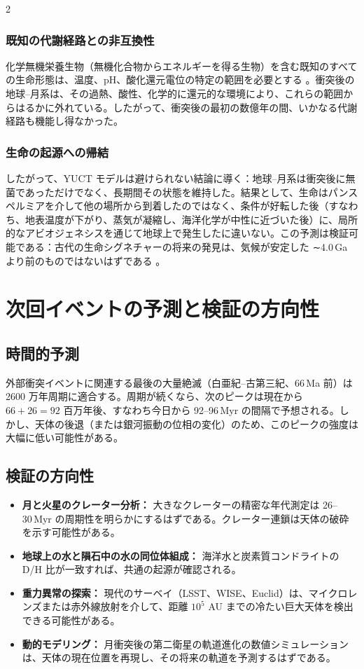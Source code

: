 \documentclass[12pt,a4paper]{article}
\begin{document}
\begin{multicols}{2}
		\subsubsection{既知の代謝経路との非互換性}
		化学無機栄養生物（無機化合物からエネルギーを得る生物）を含む既知のすべての生命形態は、温度、pH、酸化還元電位の特定の範囲を必要とする \cite{Chemolithoautotroph}。衝突後の地球–月系は、その過熱、酸性、化学的に還元的な環境により、これらの範囲からはるかに外れている。したがって、衝突後の最初の数億年の間、いかなる代謝経路も機能し得なかった。
		
		\subsubsection{生命の起源への帰結}
		したがって、YUCT モデルは避けられない結論に導く：地球–月系は衝突後に無菌であっただけでなく、長期間その状態を維持した。結果として、生命はパンスペルミアを介して他の場所から到着したのではなく、条件が好転した後（すなわち、地表温度が下がり、蒸気が凝縮し、海洋化学が中性に近づいた後）に、局所的なアビオジェネシスを通じて地球上で発生したに違いない。この予測は検証可能である：古代の生命シグネチャーの将来の発見は、気候が安定した ∼4.0 Ga より前のものではないはずである \cite{AbiogenesisReview}。
		
		\section{次回イベントの予測と検証の方向性}
		\subsection{時間的予測}
		外部衝突イベントに関連する最後の大量絶滅（白亜紀–古第三紀、66 Ma 前）は 2600 万年周期に適合する。周期が続くなら、次のピークは現在から \(66 + 26 = 92\) 百万年後、すなわち今日から 92–96 Myr の間隔で予想される。しかし、天体の後退（または銀河振動の位相の変化）のため、このピークの強度は大幅に低い可能性がある。
		
		\subsection{検証の方向性}
		\begin{itemize}
			\item \textbf{月と火星のクレーター分析：} 大きなクレーターの精密な年代測定は 26–30 Myr の周期性を明らかにするはずである。クレーター連鎖は天体の破砕を示す可能性がある。
			\item \textbf{地球上の水と隕石中の水の同位体組成：} 海洋水と炭素質コンドライトの D/H 比が一致すれば、共通の起源が確認される。
			\item \textbf{重力異常の探索：} 現代のサーベイ（LSST、WISE、Euclid）は、マイクロレンズまたは赤外線放射を介して、距離 \(10^5\) AU までの冷たい巨大天体を検出できる可能性がある。
			\item \textbf{動的モデリング：} 月衝突後の第二衛星の軌道進化の数値シミュレーションは、天体の現在位置を再現し、その将来の軌道を予測するはずである。
		\end{itemize}
		

\end{multicols}
\end{document}
